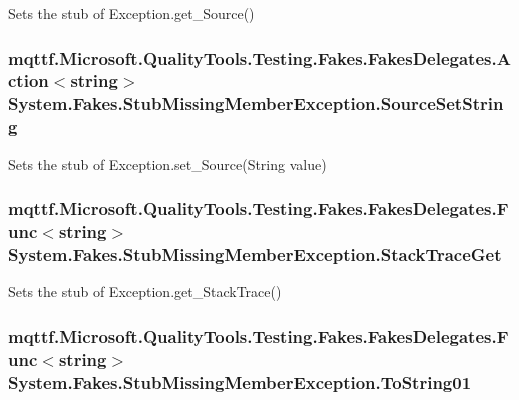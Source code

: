 Sets the stub of Exception.\-get\-\_\-\-Source()

\hypertarget{class_system_1_1_fakes_1_1_stub_missing_member_exception_a61f47a4ec94638d253e068b3ad78df64}{
\subsubsection[{Source\-Set\-String}]{\setlength{\rightskip}{0pt plus 5cm}mqttf.\-Microsoft.\-Quality\-Tools.\-Testing.\-Fakes.\-Fakes\-Delegates.\-Action$<$string$>$ System.\-Fakes.\-Stub\-Missing\-Member\-Exception.\-Source\-Set\-String}}\label{class_system_1_1_fakes_1_1_stub_missing_member_exception_a61f47a4ec94638d253e068b3ad78df64}


Sets the stub of Exception.\-set\-\_\-\-Source(\-String value)

\hypertarget{class_system_1_1_fakes_1_1_stub_missing_member_exception_ac0aafb803848199abf745416fe8e0b7d}{
\subsubsection[{Stack\-Trace\-Get}]{\setlength{\rightskip}{0pt plus 5cm}mqttf.\-Microsoft.\-Quality\-Tools.\-Testing.\-Fakes.\-Fakes\-Delegates.\-Func$<$string$>$ System.\-Fakes.\-Stub\-Missing\-Member\-Exception.\-Stack\-Trace\-Get}}\label{class_system_1_1_fakes_1_1_stub_missing_member_exception_ac0aafb803848199abf745416fe8e0b7d}


Sets the stub of Exception.\-get\-\_\-\-Stack\-Trace()

\hypertarget{class_system_1_1_fakes_1_1_stub_missing_member_exception_aadd7e498258a56ee6641300edb4a5257}{
\subsubsection[{To\-String01}]{\setlength{\rightskip}{0pt plus 5cm}mqttf.\-Microsoft.\-Quality\-Tools.\-Testing.\-Fakes.\-Fakes\-Delegates.\-Func$<$string$>$ System.\-Fakes.\-Stub\-Missing\-Member\-Exception.\-To\-String01}}\label{class_system_1_1_fakes_1_1_stub_missing_member_exception_aadd7e498258a56ee6641300edb4a5257}


